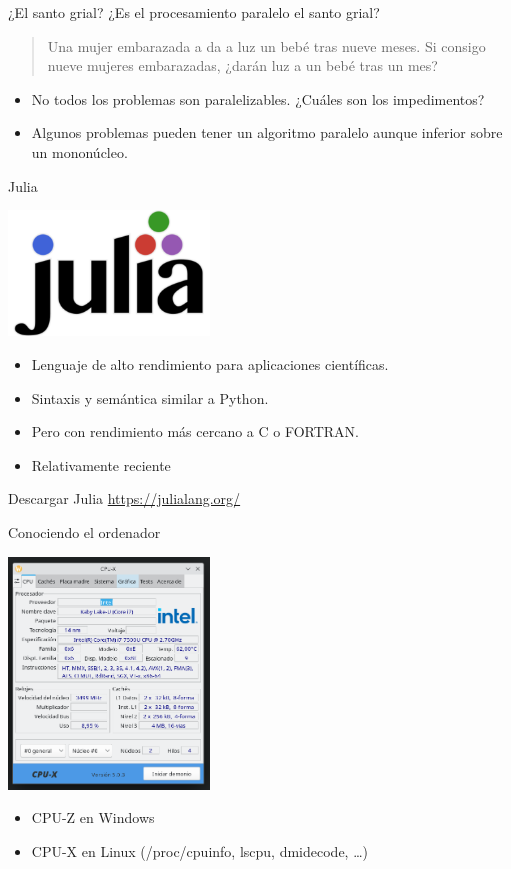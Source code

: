 \documentclass[bigger]{beamer}
\begin{document}
\begin{frame}[label={sec:orgad9e020}]{¿El santo grial?}
¿Es el procesamiento paralelo el santo grial?

\begin{quote}
Una mujer embarazada a da a luz un bebé tras nueve meses. Si consigo nueve mujeres embarazadas, ¿darán luz a un bebé tras un mes?
\end{quote}

\begin{itemize}
\item No todos los problemas son paralelizables. ¿Cuáles son los impedimentos?
\item Algunos problemas pueden tener un algoritmo paralelo aunque inferior sobre un mononúcleo.
\end{itemize}
\end{frame}

\begin{frame}[label={sec:orgbe61780}]{Julia}
\begin{center}
\includegraphics[width=0.4\textwidth]{./julia.png}
\end{center}

\begin{itemize}
\item Lenguaje de alto rendimiento para aplicaciones científicas.
\item Sintaxis y semántica similar a Python.
\item Pero con rendimiento más cercano a C o FORTRAN.
\item Relativamente reciente
\end{itemize}
\end{frame}

\begin{frame}[label={sec:orgbaef461}]{Descargar Julia}
\url{https://julialang.org/}
\end{frame}

\begin{frame}[label={sec:orga5a24ea}]{Conociendo el ordenador}
\begin{center}
\includegraphics[width=0.4\textwidth]{./CPUX.png}
\end{center}

\begin{itemize}
\item CPU-Z en Windows
\item CPU-X en Linux (/proc/cpuinfo, lscpu, dmidecode, \ldots{})
\end{itemize}
\end{frame}
\end{document}
